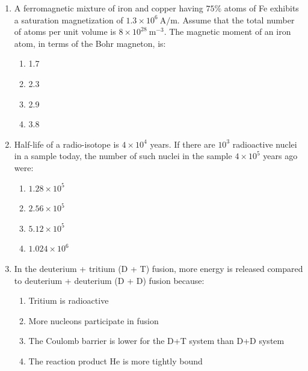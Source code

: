 \documentclass[journal,13pt,onecolumn]{IEEEtran}
\begin{document}
\begin{enumerate}[itemsep = 1em]
\item A ferromagnetic mixture of iron and copper having $75\%$ atoms of Fe exhibits a saturation magnetization of $1.3 \times 10^6 \ \mathrm{A/m}$. Assume that the total number of atoms per unit volume is $8 \times 10^{28} \ \mathrm{m}^{-3}$. The magnetic moment of an iron atom, in terms of the Bohr magneton, is:  

\hfill{}

\begin{multicols}{2}
\begin{enumerate}
    \item 1.7
    \item 2.3
    \item 2.9
    \item 3.8
\end{enumerate}
\end{multicols}

\item Half-life of a radio-isotope is $4 \times 10^4$ years. If there are $10^3$ radioactive nuclei in a sample today, the number of such nuclei in the sample $4 \times 10^5$ years ago were:  

\hfill{}

\begin{multicols}{2}
\begin{enumerate}
    \item $1.28 \times 10^5$
    \item $2.56 \times 10^5$
    \item $5.12 \times 10^5$
    \item $1.024 \times 10^6$
\end{enumerate}
\end{multicols}

\item In the deuterium + tritium (D + T) fusion, more energy is released compared to deuterium + deuterium (D + D) fusion because:  

\hfill{}

\begin{multicols}{2}
\begin{enumerate}
    \item Tritium is radioactive
    \item More nucleons participate in fusion
    \item The Coulomb barrier is lower for the D+T system than D+D system
    \item The reaction product He is more tightly bound
\end{enumerate}
\end{multicols}


\end{enumerate}
\end{document}
